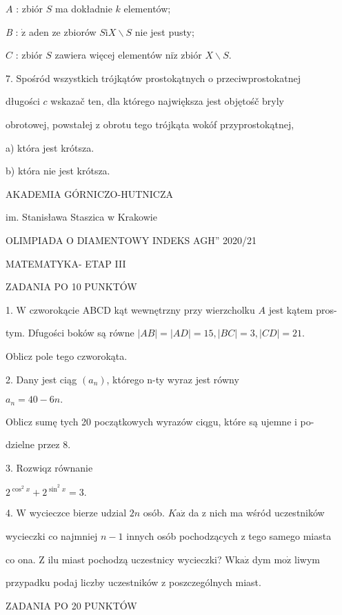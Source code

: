 \documentclass[a4paper,12pt]{article}
\begin{document}
$A$ : zbiór $S$ ma dokładnie $k$ elementów;

{\it B} : $\dot{\mathrm{z}}$ aden ze zbiorów $S\mathrm{i}X\backslash S$ nie jest pusty;

$C$ : zbiór $S$ zawiera więcej elementów $\mathrm{n}\mathrm{i}\dot{\mathrm{z}}$ zbiór $X\backslash S.$

7. Spośród wszystkich trójkątów prostokątnych o przeciwprostokatnej

długości $c$ wskazač ten, dla którego największa jest objętośč bryly

obrotowej, powstałej z obrotu tego trójkąta wokóf przyprostokątnej,

a) która jest krótsza.

b) która nie jest krótsza.






AKADEMIA GÓRNICZO-HUTNICZA

im. Stanisława Staszica w Krakowie

OLIMPIADA O DIAMENTOWY INDEKS AGH'' 2020/21

MATEMATYKA- ETAP III

ZADANIA PO 10 PUNKTÓW

1. $\mathrm{W}$ czworokącie ABCD kąt wewnętrzny przy wierzcholku $A$ jest kątem pros-

tym. Dfugości boków są równe $|AB| = |AD| = 15, |BC| =3, |CD| =21.$

Oblicz pole tego czworokąta.

2. Dany jest ciąg $(a_{n})$, którego n-ty wyraz jest równy

$a_{n}=40-6n.$

Oblicz sumę tych 20 początkowych wyrazów ciqgu, które są ujemne i po-

dzielne przez 8.

3. Rozwiqz równanie

$2^{\cos^{2}x}+2^{\sin^{2}x}=3.$

4. $\mathrm{W}$ wycieczce bierze udzial $2n$ osób. $K\mathrm{a}\dot{\mathrm{z}}$ da z nich ma wśród uczestników

wycieczki co najmniej $n-1$ innych osób pochodzących z tego samego miasta

co ona. $\mathrm{Z}$ ilu miast pochodzą uczestnicy wycieczki? $\mathrm{W}\mathrm{k}\mathrm{a}\dot{\mathrm{z}}$ dym $\mathrm{m}\mathrm{o}\dot{\mathrm{z}}$ liwym

przypadku podaj liczby uczestników z poszczególnych miast.

ZADANIA PO 20 PUNKTÓW
\end{document}
